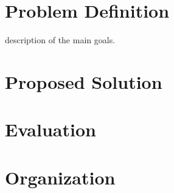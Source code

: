 \section{Problem Definition}


description of the main goals.




\section{Proposed Solution}

\section{Evaluation}

\section{Organization}

